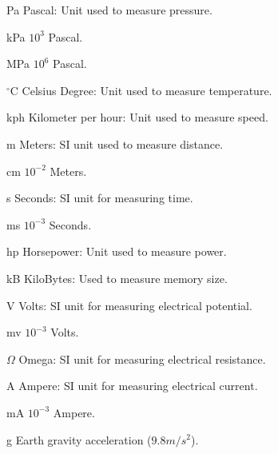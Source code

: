 \begin{simbolos}
	\item[Pa] Pascal: Unit used to measure pressure.
	\item[kPa] $10^3$ Pascal.
	\item[MPa] $10^6$ Pascal.
	\item[$^{\circ}$C] Celsius Degree: Unit used to measure temperature.
	\item[kph] Kilometer per hour: Unit used to measure speed.
	\item[m] Meters: SI unit used to measure distance.
	\item[cm] $10^{-2}$ Meters.
	\item[s] Seconds: SI unit for measuring time.
	\item[ms] $10^{-3}$ Seconds.
	\item[hp] Horsepower: Unit used to measure power.
	\item[kB] KiloBytes: Used to measure memory size.
	\item[V] Volts: SI unit for measuring electrical potential.
	\item[mv]  $10^{-3}$ Volts.
	\item[$\Omega$] Omega: SI unit for measuring electrical resistance.
	\item[A] Ampere: SI unit for measuring electrical current.
	\item[mA]  $10^{-3}$ Ampere.
	\item[g] Earth gravity acceleration ($9.8m/s^2$).
\end{simbolos}
